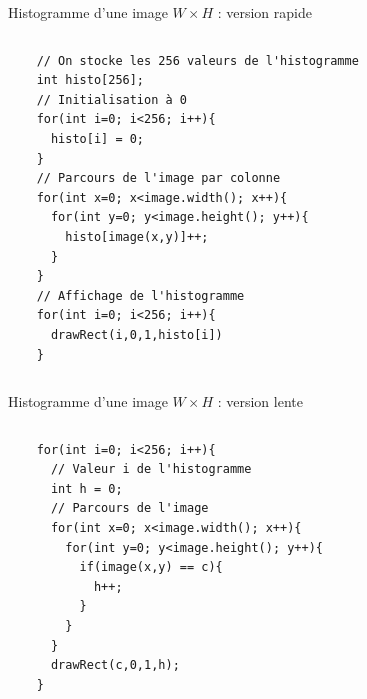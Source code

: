 \begin{frame}[fragile]{Histogramme d'une image $W\times{H}$ : version rapide}
\begin{columns}
    \begin{column}{0.65\textwidth}
    \begin{verbatim}
    // On stocke les 256 valeurs de l'histogramme 
    int histo[256];
    // Initialisation à 0
    for(int i=0; i<256; i++){
      histo[i] = 0;
    }
    // Parcours de l'image par colonne
    for(int x=0; x<image.width(); x++){
      for(int y=0; y<image.height(); y++){
        histo[image(x,y)]++;
      }
    }
    // Affichage de l'histogramme
    for(int i=0; i<256; i++){
      drawRect(i,0,1,histo[i])
    }
    \end{verbatim}
    \end{column}
    \begin{column}{0.4\textwidth}
    \end{column}
\end{columns}
\end{frame}

\begin{frame}[fragile]{Histogramme d'une image $W\times{H}$ : version lente}
\begin{columns}
    \begin{column}{0.65\textwidth}
    \begin{verbatim}
    for(int i=0; i<256; i++){
      // Valeur i de l'histogramme
      int h = 0;
      // Parcours de l'image
      for(int x=0; x<image.width(); x++){
        for(int y=0; y<image.height(); y++){
          if(image(x,y) == c){
            h++;
          }
        }
      }
      drawRect(c,0,1,h);
    }
    \end{verbatim}
    \end{column}
    \begin{column}{0.35\textwidth}
    \end{column}
\end{columns}
\end{frame}

